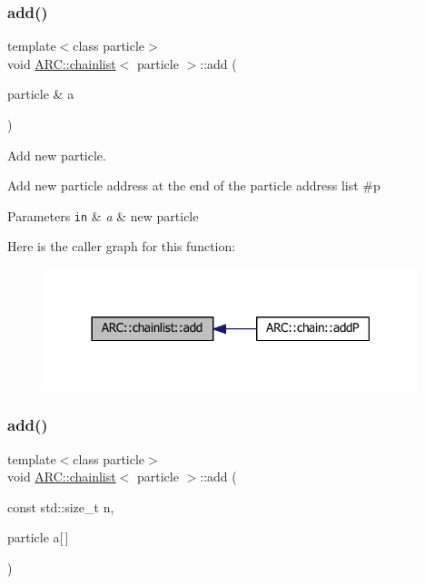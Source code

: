\subsubsection{\texorpdfstring{add()}{add()}\hspace{0.1cm}{\footnotesize\ttfamily [1/3]}}
{\footnotesize\ttfamily template$<$class particle$>$ \\
void \hyperlink{classARC_1_1chainlist}{A\+R\+C\+::chainlist}$<$ particle $>$\+::add (\begin{DoxyParamCaption}\item[{particle \&}]{a }\end{DoxyParamCaption})\hspace{0.3cm}{\ttfamily [inline]}}



Add new particle. 

Add new particle address at the end of the particle address list \#p 
\begin{DoxyParams}[1]{Parameters}
\mbox{\tt in}  & {\em a} & new particle \\
\hline
\end{DoxyParams}
Here is the caller graph for this function\+:
\nopagebreak
\begin{figure}[H]
\begin{center}
\leavevmode
\includegraphics[width=309pt]{classARC_1_1chainlist_afa780edfa301cc22cf189e63d7a59c2c_icgraph}
\end{center}
\end{figure}
\hypertarget{classARC_1_1chainlist_a2dba82eb1c3caa32fc76b619c5379da5}{}\label{classARC_1_1chainlist_a2dba82eb1c3caa32fc76b619c5379da5} 
\subsubsection{\texorpdfstring{add()}{add()}\hspace{0.1cm}{\footnotesize\ttfamily [2/3]}}
{\footnotesize\ttfamily template$<$class particle$>$ \\
void \hyperlink{classARC_1_1chainlist}{A\+R\+C\+::chainlist}$<$ particle $>$\+::add (\begin{DoxyParamCaption}\item[{const std\+::size\+\_\+t}]{n,  }\item[{particle}]{a\mbox{[}$\,$\mbox{]} }\end{DoxyParamCaption})\hspace{0.3cm}{\ttfamily [inline]}}



